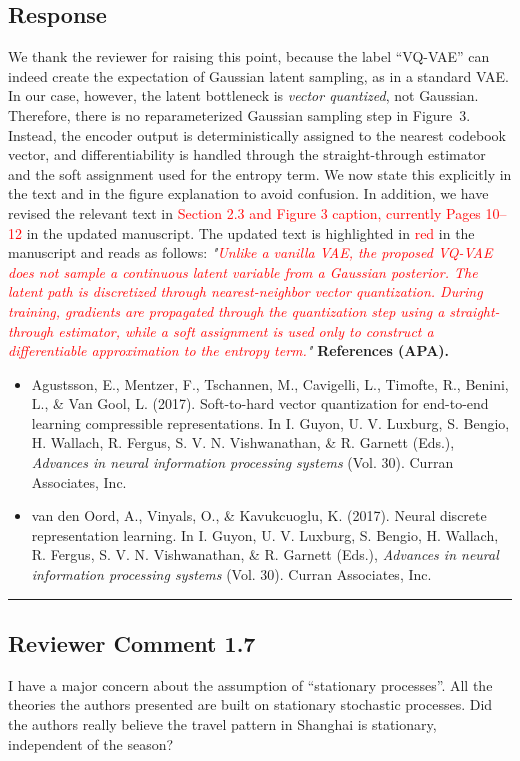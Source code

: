 \documentclass{NSF}
\begin{document}
\subsection{Response}
We thank the reviewer for raising this point, because the label ``VQ-VAE'' can indeed create the expectation of Gaussian latent sampling, as in a standard VAE. In our case, however, the latent bottleneck is \emph{vector quantized}, not Gaussian. Therefore, there is no reparameterized Gaussian sampling step in Figure~3. Instead, the encoder output is deterministically assigned to the nearest codebook vector, and differentiability is handled through the straight-through estimator and the soft assignment used for the entropy term. We now state this explicitly in the text and in the figure explanation to avoid confusion.
\noindent In addition, we have revised the relevant text in \textcolor{red}{Section 2.3 and Figure 3 caption, currently Pages 10--12} in the updated manuscript. The updated text is highlighted in \textcolor{red}{red} in the manuscript and reads as follows:
\vskip 0.1cm
\noindent \textit{"\textcolor{red}{Unlike a vanilla VAE, the proposed VQ-VAE does not sample a continuous latent variable from a Gaussian posterior. The latent path is discretized through nearest-neighbor vector quantization. During training, gradients are propagated through the quantization step using a straight-through estimator, while a soft assignment is used only to construct a differentiable approximation to the entropy term.}"}
\vskip 0.05in
\noindent\textbf{References (APA).}
\begin{itemize}
    \item Agustsson, E., Mentzer, F., Tschannen, M., Cavigelli, L., Timofte, R., Benini, L., \& Van Gool, L. (2017). Soft-to-hard vector quantization for end-to-end learning compressible representations. In I. Guyon, U. V. Luxburg, S. Bengio, H. Wallach, R. Fergus, S. V. N. Vishwanathan, \& R. Garnett (Eds.), \textit{Advances in neural information processing systems} (Vol. 30). Curran Associates, Inc.
    \item van den Oord, A., Vinyals, O., \& Kavukcuoglu, K. (2017). Neural discrete representation learning. In I. Guyon, U. V. Luxburg, S. Bengio, H. Wallach, R. Fergus, S. V. N. Vishwanathan, \& R. Garnett (Eds.), \textit{Advances in neural information processing systems} (Vol. 30). Curran Associates, Inc.
\end{itemize}

\noindent\rule{16.5cm}{1.0pt}

\subsection{Reviewer Comment 1.7}
\begin{mdframed}
I have a major concern about the assumption of ``stationary processes''. All the theories the authors presented are built on stationary stochastic processes. Did the authors really believe the travel pattern in Shanghai is stationary, independent of the season?
\end{mdframed}
\end{document}
